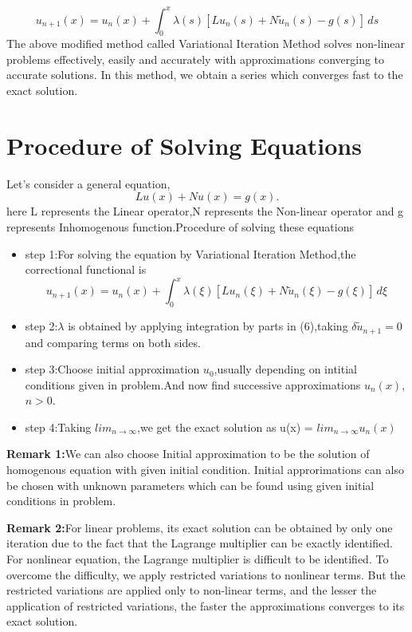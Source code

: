 \documentclass[12pt, a4paper]{report}
\begin{document}
     \begin{equation}
            u_{n+1}(x) = u_n(x) + \int_{0}^{x} \lambda(s) [Lu_n(s)+N\tilde{u}_n(s)-g(s)]\,ds
     \end{equation}
The above modified method called Variational Iteration Method solves non-linear problems effectively, easily and accurately with approximations converging to accurate solutions. In this method, we obtain a series which converges fast to the exact solution.
\section{Procedure of Solving Equations}
Let's consider a general equation,
\begin{equation}
    Lu(x) +Nu(x) = g(x).
\end{equation}
here L represents the Linear operator,N represents the Non-linear operator and g represents Inhomogenous function.Procedure of solving these equations
\begin{itemize}
    \item step 1:For solving the equation by Variational Iteration Method,the correctional functional is 
    \begin{equation}
        u_{n+1}(x) = u_n(x) + \int_{0}^{x} \lambda(\xi) [Lu_n(\xi)+N\tilde{u}_n(\xi)-g(\xi)]\,d\xi
    \end{equation}
    
    \item step 2:$\lambda$ is obtained by applying integration by parts in (6),taking $\delta \tilde{u}_{n+1}=0$ and comparing terms on both sides.

    
    \item step 3:Choose initial approximation $u_0 $,usually depending on intitial conditions given in problem.And now find successive approximations $u_n(x)$, $n > 0$.

   
    \item step 4:Taking $lim_{n\to\infty}$,we get the exact solution as u(x) = $ l  i  m_{n\to\infty}$$ u_n(x)$

    
\end{itemize}

\textbf{Remark 1:}We can also choose Initial approximation to be the solution of homogenous equation with given initial condition. Initial approrimations can also be chosen with unknown parameters which can be found using given initial conditions in problem.

\textbf{Remark 2:}For linear problems, its exact solution can be obtained by only one iteration due to the fact that the Lagrange multiplier can be exactly identified. For nonlinear equation, the Lagrange multiplier is difficult to be identified. To overcome the difficulty, we apply restricted variations to nonlinear terms. But the restricted variations are applied only to non-linear terms, and the lesser the application of restricted variations, the faster the approximations converges to its exact solution.
\end{document}

